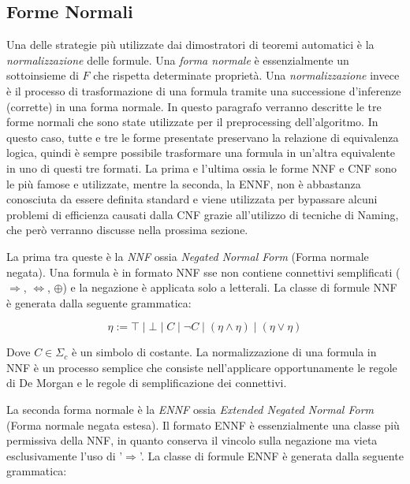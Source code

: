 \documentclass[./main.tex]{subfiles}
\begin{document}

\subsection{Forme Normali} \label{sec:forme_normali}
Una delle strategie più utilizzate dai dimostratori di teoremi automatici è la \textit{normalizzazione} delle formule. Una \textit{forma normale}
è essenzialmente un sottoinsieme di $F$ che rispetta determinate proprietà. Una \textit{normalizzazione} invece è il processo di trasformazione di una formula
tramite una successione d'inferenze (corrette) in una forma normale.
In questo paragrafo verranno descritte le tre forme normali che sono state utilizzate per il preprocessing
dell'algoritmo. In questo caso, tutte e tre le forme presentate preservano la relazione di equivalenza logica, quindi è sempre possibile
trasformare una formula in un'altra equivalente in uno di questi tre formati. 
La prima e l'ultima ossia le forme NNF e CNF sono le più famose e utilizzate, mentre la seconda, la ENNF, non è abbastanza conosciuta da essere definita standard
e viene utilizzata per bypassare alcuni problemi di efficienza causati dalla CNF grazie all'utilizzo di tecniche di Naming, che però verranno discusse nella prossima sezione.

La prima tra queste è la \textit{NNF} ossia \textit{Negated Normal Form} (Forma normale negata). Una formula è in formato NNF 
sse non contiene connettivi semplificati ($\Rightarrow$, $\Leftrightarrow$, $\oplus$) e la negazione è applicata solo a letterali. La classe di formule 
NNF è generata dalla seguente grammatica:

$$ \eta := \top \mid \bot \mid C \mid \lnot C \mid (\eta \land \eta) \mid (\eta \lor \eta ) $$

Dove $C \in \Sigma_c$ è un simbolo di costante. La normalizzazione di una formula in NNF è un processo semplice che consiste nell'applicare opportunamente 
le regole di De Morgan e le regole di semplificazione dei connettivi.

La seconda forma normale è la \textit{ENNF} ossia \textit{Extended Negated Normal Form} (Forma normale negata estesa). 
Il formato ENNF è essenzialmente una classe più permissiva della NNF, in quanto conserva il vincolo sulla negazione ma 
vieta esclusivamente l'uso di '$\Rightarrow$'. La classe di formule ENNF è generata dalla seguente grammatica:
 
\end{document}

